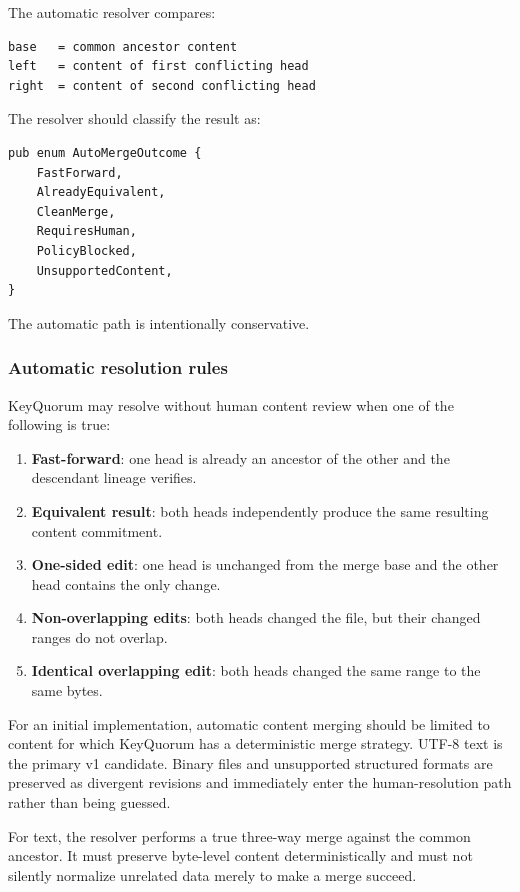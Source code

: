 \documentclass[11pt]{article}
\begin{document}
The automatic resolver compares:

\begin{lstlisting}
base   = common ancestor content
left   = content of first conflicting head
right  = content of second conflicting head
\end{lstlisting}

The resolver should classify the result as:

\begin{lstlisting}
pub enum AutoMergeOutcome {
    FastForward,
    AlreadyEquivalent,
    CleanMerge,
    RequiresHuman,
    PolicyBlocked,
    UnsupportedContent,
}
\end{lstlisting}

The automatic path is intentionally conservative.

\subsubsection*{Automatic resolution rules}

KeyQuorum may resolve without human content review when one of the following is true:

\begin{enumerate}[leftmargin=1.8em]
  \item \textbf{Fast-forward}: one head is already an ancestor of the other and the descendant lineage verifies.
  \item \textbf{Equivalent result}: both heads independently produce the same resulting content commitment.
  \item \textbf{One-sided edit}: one head is unchanged from the merge base and the other head contains the only change.
  \item \textbf{Non-overlapping edits}: both heads changed the file, but their changed ranges do not overlap.
  \item \textbf{Identical overlapping edit}: both heads changed the same range to the same bytes.
\end{enumerate}

For an initial implementation, automatic content merging should be limited to content for which KeyQuorum has a deterministic merge strategy. UTF-8 text is the primary v1 candidate. Binary files and unsupported structured formats are preserved as divergent revisions and immediately enter the human-resolution path rather than being guessed.

For text, the resolver performs a true three-way merge against the common ancestor. It must preserve byte-level content deterministically and must not silently normalize unrelated data merely to make a merge succeed.
\end{document}
